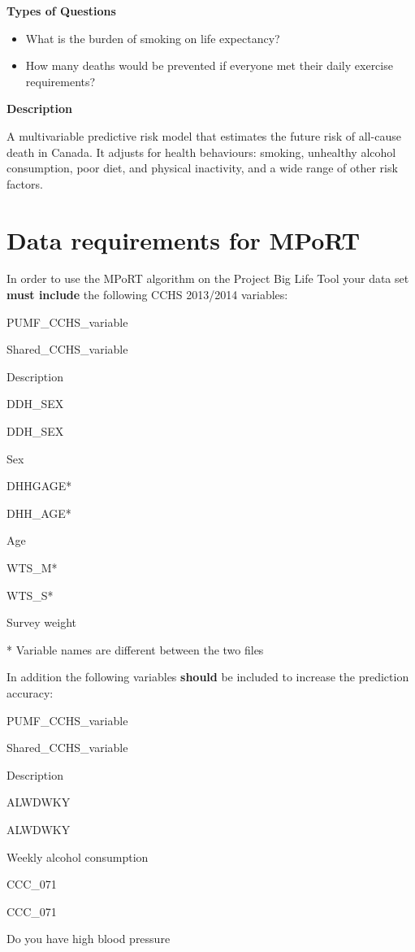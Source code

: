 \documentclass[]{book}
\providecommand{\tightlist}{%
  \setlength{\itemsep}{0pt}\setlength{\parskip}{0pt}}
\begin{document}
\textbf{Types of Questions}

\begin{itemize}
\tightlist
\item
  What is the burden of smoking on life expectancy?
\item
  How many deaths would be prevented if everyone met their daily
  exercise requirements?
\end{itemize}

\textbf{Description}

A multivariable predictive risk model that estimates the future risk of
all-cause death in Canada. It adjusts for health behaviours: smoking,
unhealthy alcohol consumption, poor diet, and physical inactivity, and a
wide range of other risk factors.

\section{Data requirements for MPoRT}\label{data-requirements-for-mport}

In order to use the MPoRT algorithm on the Project Big Life Tool your
data set \textbf{must include} the following CCHS 2013/2014 variables:

PUMF\_CCHS\_variable

Shared\_CCHS\_variable

Description

DDH\_SEX

DDH\_SEX

Sex

DHHGAGE*

DHH\_AGE*

Age

WTS\_M*

WTS\_S*

Survey weight

* Variable names are different between the two files

In addition the following variables \textbf{should} be included to
increase the prediction accuracy:

PUMF\_CCHS\_variable

Shared\_CCHS\_variable

Description

ALWDWKY

ALWDWKY

Weekly alcohol consumption

CCC\_071

CCC\_071

Do you have high blood pressure
\end{document}

